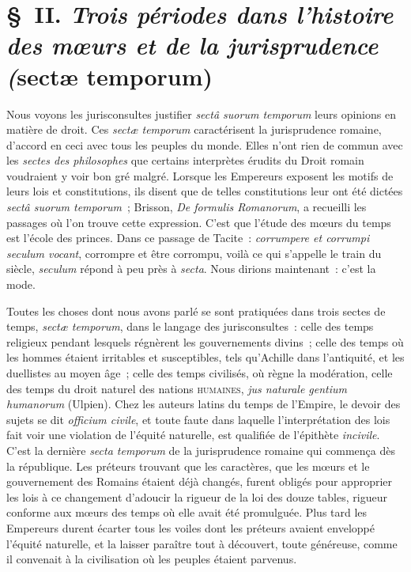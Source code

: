 \documentclass[french,twoside]{book} %
\newcommand\chapterclose{} %
\begin{document}
\section[{§ II. Trois périodes dans l’histoire des mœurs et de la jurisprudence (sectæ temporum)}]{§ II. {\itshape Trois périodes dans l’histoire des mœurs et de la jurisprudence (}sectæ temporum)}
\noindent Nous voyons les jurisconsultes justifier {\itshape sectâ suorum temporum} leurs opinions en matière de droit. Ces {\itshape sectæ temporum} caractérisent la jurisprudence romaine, d’accord en ceci avec tous les peuples du monde. Elles n’ont rien de commun avec les {\itshape sectes des philosophes} que certains interprètes érudits du Droit romain voudraient y voir bon gré malgré. Lorsque les Empereurs exposent les motifs de leurs lois et constitutions, ils disent que de telles constitutions leur ont été dictées \emph{{\itshape sectâ suorum temporum}} ; Brisson, {\itshape De formulis Romanorum}, a recueilli les passages où l’on trouve cette expression. C’est que l’étude des mœurs du temps est l’école des princes. Dans ce passage de Tacite : \emph{{\itshape corrumpere et corrumpi seculum vocant}}, corrompre et être corrompu, voilà ce qui s’appelle le train du siècle, {\itshape seculum} répond à peu près à {\itshape secta}. Nous dirions maintenant : c’est la mode.\par
Toutes les choses dont nous avons parlé se  sont pratiquées dans trois sectes de temps, {\itshape sectæ temporum}, dans le langage des jurisconsultes : celle des temps religieux pendant lesquels régnèrent les gouvernements divins ; celle des temps où les hommes étaient irritables et susceptibles, tels qu’Achille dans l’antiquité, et les duellistes au moyen âge ; celle des temps civilisés, où règne la modération, celle des temps du droit naturel des nations {\scshape humaines}, \emph{{\itshape jus naturale gentium humanorum}} (Ulpien). Chez les auteurs latins du temps de l’Empire, le devoir des sujets se dit {\itshape officium civile}, et toute faute dans laquelle l’interprétation des lois fait voir une violation de l’équité naturelle, est qualifiée de l’épithète {\itshape incivile}. C’est la dernière {\itshape secta temporum} de la jurisprudence romaine qui commença dès la république. Les préteurs trouvant que les caractères, que les mœurs et le gouvernement des Romains étaient déjà changés, furent obligés pour approprier les lois à ce changement d’adoucir la rigueur de la loi des douze tables, rigueur conforme aux mœurs des temps où elle avait été promulguée. Plus tard les Empereurs durent écarter tous les voiles dont les préteurs avaient enveloppé l’équité naturelle, et la laisser paraître tout à découvert, toute généreuse, comme il convenait à la civilisation où les peuples étaient parvenus.
\chapterclose
\end{document}
